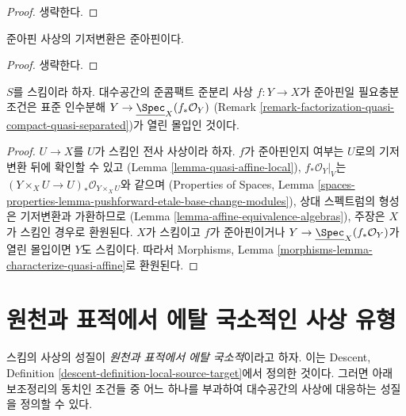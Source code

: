 \begin{proof}
생략한다.
\end{proof}

\begin{lemma}
\label{lemma-base-change-quasi-affine}
준아핀 사상의 기저변환은 준아핀이다.
\end{lemma}

\begin{proof}
생략한다.
\end{proof}

\begin{lemma}
\label{lemma-characterize-quasi-affine}
$S$를 스킴이라 하자.
대수공간의 준콤팩트 준분리 사상
$f : Y \to X$가 준아핀일 필요충분조건은 표준 인수분해
$Y \to \underline{\Spec}_X(f_*\mathcal{O}_Y)$
(Remark \ref{remark-factorization-quasi-compact-quasi-separated})가
열린 몰입인 것이다.
\end{lemma}

\begin{proof}
$U \to X$를 $U$가 스킴인 전사 사상이라 하자.
$f$가 준아핀인지 여부는 $U$로의 기저변환 뒤에 확인할 수 있고
(Lemma \ref{lemma-quasi-affine-local}),
$f_*\mathcal{O}_Y|_V$는
$(Y \times_X U \to U)_*\mathcal{O}_{Y \times_X U}$와 같으며
(Properties of Spaces, Lemma
\ref{spaces-properties-lemma-pushforward-etale-base-change-modules}),
상대 스펙트럼의 형성은 기저변환과 가환하므로
(Lemma \ref{lemma-affine-equivalence-algebras}), 주장은 $X$가
스킴인 경우로 환원된다. $X$가 스킴이고 $f$가 준아핀이거나
$Y \to \underline{\Spec}_X(f_*\mathcal{O}_Y)$가 열린 몰입이면
$Y$도 스킴이다. 따라서 Morphisms, Lemma
\ref{morphisms-lemma-characterize-quasi-affine}로 환원된다.
\end{proof}

\section{원천과 표적에서 에탈 국소적인 사상 유형}
\label{section-local-source-target}

\noindent
스킴의 사상의 성질이 {\it 원천과 표적에서 에탈 국소적}이라고 하자.
이는 Descent, Definition
\ref{descent-definition-local-source-target}에서 정의한 것이다.
그러면 아래 보조정리의 동치인 조건들 중 어느 하나를 부과하여
대수공간의 사상에 대응하는 성질을 정의할 수 있다.

